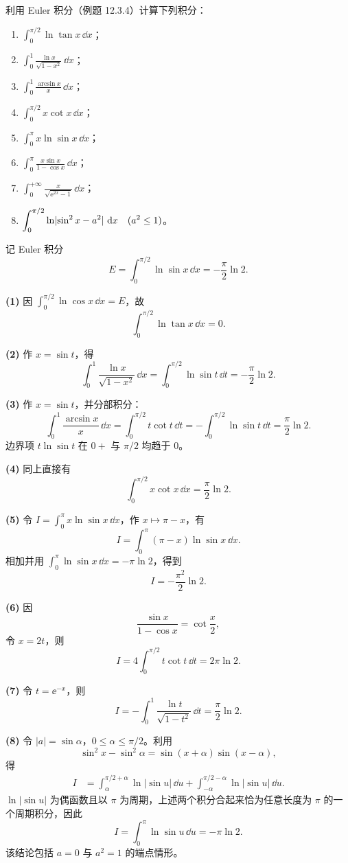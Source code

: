 \begin{xexercise}[3]
利用 Euler 积分（例题 12.3.4）计算下列积分：
  \begin{enumerate}[label=(\arabic*)]
    \item $\displaystyle\int_0^{\pi/2}\ln\tan x\,\dd x$；
    \item $\displaystyle\int_0^1\frac{\ln x}{\sqrt{1-x^2}}\,\dd x$；
    \item $\displaystyle\int_0^1\frac{\arcsin x}{x}\,\dd x$；
    \item $\displaystyle\int_0^{\pi/2}x\cot x\,\dd x$；
    \item $\displaystyle\int_0^\pi x\ln\sin x\,\dd x$；
    \item $\displaystyle\int_0^\pi\frac{x\sin x}{1-\cos x}\,\dd x$；
    \item $\displaystyle\int_0^{+\infty}\frac{x}{\sqrt{\ee^{2x}-1}}\,\dd x$；
    \item $\displaystyle\int_0^{\pi/2}\ln\lvert\sin^2x-a^2\rvert\,\mathop{}\!\mathrm{d} x\quad(a^2\leq1)$。
  \end{enumerate}
\end{xexercise}
\begin{xsolution}
记 Euler 积分
\[
  E=\int_0^{\pi/2}\ln\sin x\,\dd x=-\frac\pi2\ln2.
\]

\textbf{(1)} 因 $\int_0^{\pi/2}\ln\cos x\,\dd x=E$，故
\[
  \boxed{\int_0^{\pi/2}\ln\tan x\,\dd x=0}.
\]

\textbf{(2)} 作 $x=\sin t$，得
\[
  \boxed{\int_0^1\frac{\ln x}{\sqrt{1-x^2}}\,\dd x
  =\int_0^{\pi/2}\ln\sin t\,\dd t=-\frac\pi2\ln2.}
\]

\textbf{(3)} 作 $x=\sin t$，并分部积分：
\[
  \int_0^1\frac{\arcsin x}{x}\,\dd x
  =\int_0^{\pi/2}t\cot t\,\dd t
  =-\int_0^{\pi/2}\ln\sin t\,\dd t
  =\boxed{\frac\pi2\ln2}.
\]
边界项 $t\ln\sin t$ 在 $0+$ 与 $\pi/2$ 均趋于 $0$。

\textbf{(4)} 同上直接有
\[
  \boxed{\int_0^{\pi/2}x\cot x\,\dd x=\frac\pi2\ln2}.
\]

\textbf{(5)} 令 $I=\int_0^\pi x\ln\sin x\,\dd x$，作 $x\mapsto\pi-x$，有
\[
  I=\int_0^\pi(\pi-x)\ln\sin x\,\dd x.
\]
相加并用 $\int_0^\pi\ln\sin x\,\dd x=-\pi\ln2$，得到
\[
  \boxed{I=-\frac{\pi^2}{2}\ln2}.
\]

\textbf{(6)} 因
\[
  \frac{\sin x}{1-\cos x}=\cot\frac x2,
\]
令 $x=2t$，则
\[
  I=4\int_0^{\pi/2}t\cot t\,\dd t
  =\boxed{2\pi\ln2}.
\]

\textbf{(7)} 令 $t=\ee^{-x}$，则
\[
  I=-\int_0^1\frac{\ln t}{\sqrt{1-t^2}}\,\dd t
  =\boxed{\frac\pi2\ln2}.
\]

\textbf{(8)} 令 $|a|=\sin\alpha$，$0\leq\alpha\leq\pi/2$。利用
\[
  \sin^2x-\sin^2\alpha=\sin(x+\alpha)\sin(x-\alpha),
\]
得
\begin{align*}
  I&=\int_\alpha^{\pi/2+\alpha}\ln|\sin u|\,\dd u
    +\int_{-\alpha}^{\pi/2-\alpha}\ln|\sin u|\,\dd u.
\end{align*}
$\ln|\sin u|$ 为偶函数且以 $\pi$ 为周期，上述两个积分合起来恰为任意长度为 $\pi$ 的一个周期积分，因此
\[
  \boxed{I=\int_0^\pi\ln\sin u\,\dd u=-\pi\ln2}.
\]
该结论包括 $a=0$ 与 $a^2=1$ 的端点情形。
\end{xsolution}


